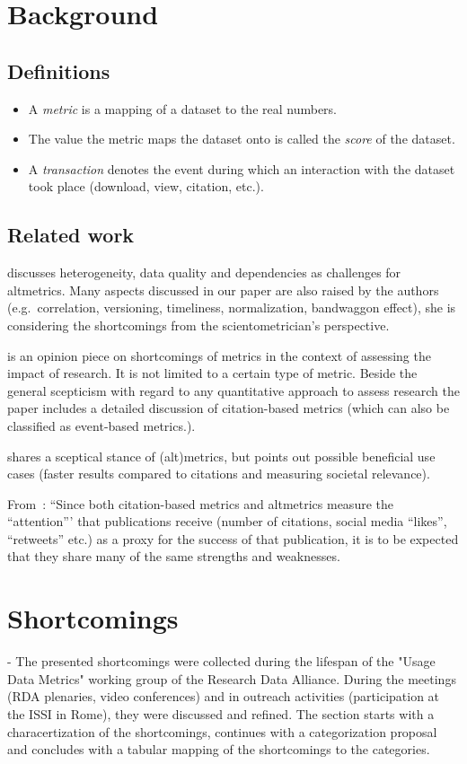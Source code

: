 \documentclass[conference, a4paper]{IEEEtran}\usepackage[]{graphicx}\usepackage[]{color}
\begin{document}
\section{Background}\label{sec:background}
\subsection{Definitions}
\begin{itemize}
    \item A \emph{metric} is a mapping of a dataset to the real numbers.
    \item The value the metric maps the dataset onto is called the \emph{score} of the dataset.
    \item A \emph{transaction} denotes the event during which an interaction with the dataset
        took place (download, view, citation, etc.).
\end{itemize}

\subsection{Related work}

\cite{sh059} discusses heterogeneity, data quality and dependencies as challenges for altmetrics.
Many aspects discussed in our paper are also raised by the authors
(e.g.\ correlation, versioning, timeliness, normalization, bandwaggon effect),
she is considering the shortcomings from the scientometrician's perspective.

\cite{sh029} is an opinion piece on shortcomings of metrics
in the context of assessing the impact of research.
It is not limited to a certain type of metric.
Beside the general scepticism with regard to any quantitative approach to assess research
the paper includes a detailed discussion of citation-based metrics
(which can also be classified as event-based metrics.).

\cite{sh044} shares a sceptical stance of (alt)metrics,
but points out possible beneficial use cases
(faster results compared to citations and measuring societal relevance).

From~\cite{sh007}:
``Since both citation-based metrics and altmetrics measure the ``attention''' that
publications receive (number of citations, social media ``likes'', ``retweets'' etc.)
as a proxy for the success of that publication,
it is to be expected that they share many of the same strengths and weaknesses.

\section{Shortcomings}\label{sec:shortcomings}
-
The presented shortcomings were collected during
the lifespan of the "Usage Data Metrics" working group of the Research Data Alliance.
During the meetings (RDA plenaries, video conferences) and in outreach activities
(participation at the ISSI in Rome),
they were discussed and refined.
The section starts with a characertization of the shortcomings,
continues with a categorization proposal
and concludes with a tabular mapping of the shortcomings to the categories.
\end{document}
